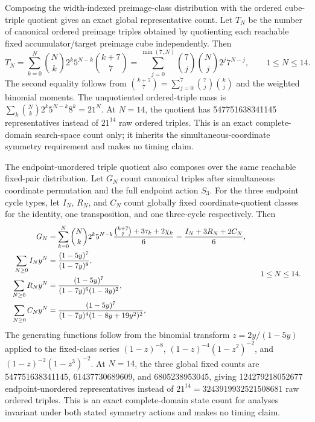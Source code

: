 \documentclass{article}
\newcommand{\fitmath}[1]{\resizebox{0.99\linewidth}{!}{$\displaystyle #1$}}
\begin{document}
Composing the width-indexed preimage-class distribution with the ordered
cube-triple quotient gives an exact global representative count. Let $T_N$ be
the number of canonical ordered preimage triples obtained by quotienting each
reachable fixed accumulator/target preimage cube independently. Then
\begin{equation}
  T_N
    =\sum_{k=0}^{N}\binom{N}{k}2^k5^{N-k}\binom{k+7}{7}
    =\sum_{j=0}^{\min(7,N)}
      \binom{7}{j}\binom{N}{j}2^j7^{N-j},
  \qquad 1\leq N\leq14.
  \label{eq:optimization-crazy-global-ordered-preimage-triple-quotient}
\end{equation}
The second equality follows from
$\binom{k+7}{7}=\sum_{j=0}^{7}\binom{7}{j}\binom{k}{j}$ and the weighted
binomial moments. The unquotiented ordered-triple mass is
$\sum_k\binom{N}{k}2^k5^{N-k}8^k=21^N$. At $N=14$, the quotient has
547751638341145 representatives instead of $21^{14}$ raw ordered triples. This
is an exact complete-domain search-space count only; it inherits the
simultaneous-coordinate symmetry requirement and makes no timing claim.

The endpoint-unordered triple quotient also composes over the same reachable
fixed-pair distribution. Let $G_N$ count canonical triples after simultaneous
coordinate permutation and the full endpoint action $S_3$. For the three
endpoint cycle types, let $I_N$, $R_N$, and $C_N$ count globally fixed
coordinate-quotient classes for the identity, one transposition, and one
three-cycle respectively. Then
\begin{equation}
  \fitmath{%
    \begin{aligned}
      G_N&=\sum_{k=0}^{N}\binom{N}{k}2^k5^{N-k}
        \frac{\binom{k+7}{7}+3\tau_k+2\chi_k}{6}
        =\frac{I_N+3R_N+2C_N}{6},\\
      \sum_{N\geq0}I_N y^N&=\frac{(1-5y)^7}{(1-7y)^8},\\
      \sum_{N\geq0}R_N y^N&=
        \frac{(1-5y)^7}{(1-7y)^6(1-3y)^2},\\
      \sum_{N\geq0}C_N y^N&=
        \frac{(1-5y)^7}{(1-7y)^4(1-8y+19y^2)^2},
    \end{aligned}
    \qquad 1\leq N\leq14.
  }
  \label{eq:optimization-crazy-global-unordered-preimage-triple-quotient}
\end{equation}
The generating functions follow from the binomial transform
$z=2y/(1-5y)$ applied to the fixed-class series
$(1-z)^{-8}$, $(1-z)^{-4}(1-z^2)^{-2}$, and
$(1-z)^{-2}(1-z^3)^{-2}$. At $N=14$, the three global fixed counts are
547751638341145, 61437730689609, and 6805238953045, giving
124279218052677 endpoint-unordered representatives instead of
$21^{14}=3243919932521508681$ raw ordered triples. This is an exact
complete-domain state count for analyses invariant under both stated symmetry
actions and makes no timing claim.
\end{document}
